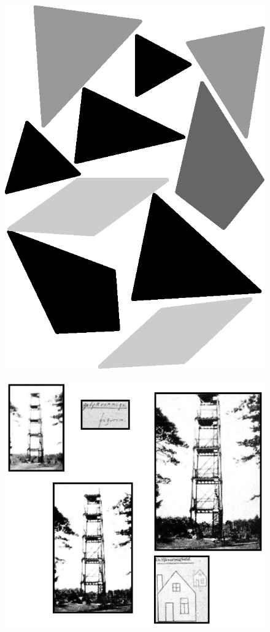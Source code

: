 \begin{figure}[H]
\centering
\includegraphics[scale=.7]{figure/fig_31.eps}
\caption{}\label{chap6-fig31}
\end{figure}

\begin{figure}[H]
\centering
\includegraphics[scale=.8]{figure/fig_32.eps}
\caption{}\label{chap6-fig32}
\end{figure}

